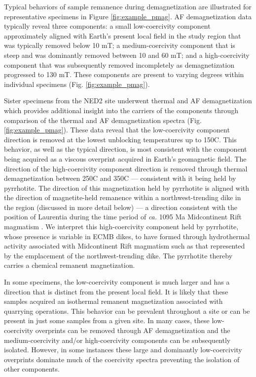 \documentclass[draft]{agujournal2019}
\begin{document}
Typical behaviors of sample remanence during demagnetization are illustrated for representative specimens in Figure \ref{fig:example_pmag}. AF demagnetization data typically reveal three components: a small low-coercivity component approximately aligned with Earth's present local field in the study region that was typically removed below 10 mT; a medium-coercivity component that is steep and was dominantly removed between 10 and 60 mT; and a high-coercivity component that was subsequently removed incompletely as demagnetization progressed to 130 mT. These components are present to varying degrees within individual specimens (Fig. \ref{fig:example_pmag}).

Sister specimens from the NED2 site underwent thermal and AF demagnetization which provides additional insight into the carriers of the components through comparison of the thermal and AF demagnetization spectra (Fig. \ref{fig:example_pmag}). These data reveal that the low-coercivity component direction is removed at the lowest unblocking temperatures up to 150\textdegree C. This behavior, as well as the typical direction, is most consistent with the component being acquired as a viscous overprint acquired in Earth's geomagnetic field. The direction of the high-coercivity component direction is removed through thermal demagnetization between 250\textdegree C and 350\textdegree C --- consistent with it being held by pyrrhotite. The direction of this magnetization held by pyrrhotite is aligned with the direction of magnetite-held remanence within a northwest-trending dike in the region (discussed in more detail below) --- a direction consistent with the position of Laurentia during the time period of \textit{ca.} 1095 Ma Midcontinent Rift magmatism \cite{Swanson-Hysell2020a}. We interpret this high-coercivity component held by pyrrhotite, whose presence is variable in ECMB dikes, to have formed through hydrothermal activity associated with Midcontinent Rift magmatism such as that represented by the emplacement of the northwest-trending dike. The pyrrhotite thereby carries a chemical remanent magnetization. 

In some specimens, the low-coercivity component is much larger and has a direction that is distinct from the present local field. It is likely that these samples acquired an isothermal remanent magnetization associated with quarrying operations. This behavior can be prevalent throughout a site or can be present in just some samples from a given site. In many cases, these low-coercivity overprints can be removed through AF demagnetization and the medium-coercivity and/or high-coercivity components can be subsequently isolated. However, in some instances these large and dominantly low-coercivity overprints dominate much of the coercivity spectra preventing the isolation of other components.
\end{document}
